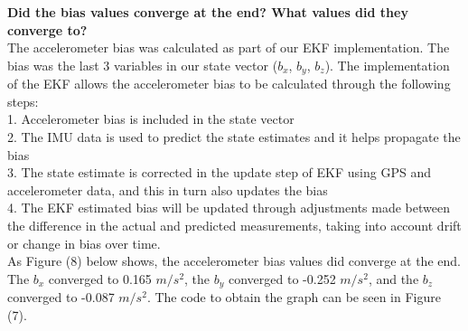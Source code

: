 \textbf{Did the bias values converge at the end? What values did they converge to?}\\

The accelerometer bias was calculated as part of our EKF implementation. The bias was the last 3 variables in our state vector ($b_x$, $b_y$, $b_z$). The implementation of the EKF allows the accelerometer bias to be calculated through the following steps:\\

1. Accelerometer bias is included in the state vector\\
2. The IMU data is used to predict the state estimates and it helps propagate the bias\\
3. The state estimate is corrected in the update step of EKF using GPS and accelerometer data, and this in turn also updates the bias\\
4. The EKF estimated bias will be updated through adjustments made between the difference in the actual and predicted measurements, taking into account drift or change in bias over time.\\

As Figure (8) below shows, the accelerometer bias values did converge at the end. The $b_x$ converged to 0.165 $m/s^2$, the $b_y$ converged to -0.252 $m/s^2$, and the $b_z$ converged to -0.087 $m/s^2$. The code to obtain the graph can be seen in Figure (7).

